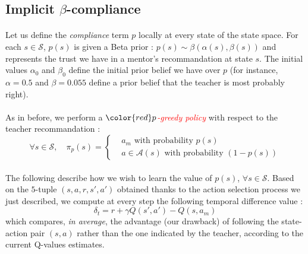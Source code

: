 \documentclass[a4paper]{report}
\begin{document}
{{{		\subsection{Implicit $\beta$-compliance}
		{
			\paragraph{}  Let us define the \emph{compliance} term $p$ locally at every state of the state space. For each $s\in\mathcal{S}$, $p(s)$ is given a Beta prior : $p(s)\sim \beta(\alpha(s),\beta(s))$ and represents the trust we have in a mentor's recommandation at state $s$. The initial values $\alpha_0$ and $\beta_0$ define the initial prior belief we have over $p$ (for instance, $\alpha=0.5$ and $\beta = 0.055$ define a prior belief that the teacher is most probably right). 
			
			\paragraph{} As in before, we perform a $\color{red}p$\textcolor{red}{\emph{-greedy policy}} with respect to the teacher recommandation : 
			\begin{equation}
				\forall s\in\mathcal{S}, \quad \pi_p(s) = 
					\left\{ 
					\begin{aligned}
						&a_m \text{ with probability } p(s) \\
						& a\in\mathcal{A}(s) \text{ with probability } (1-p(s))
					\end{aligned}
					\right. 
			\end{equation}
		
			\paragraph{} The following describe how we wish to learn the value of $p(s)$, $\forall s\in\mathcal{S}$. Based on the $5$-tuple $(s,a,r,s',a')$ obtained thanks to the action selection process we just described, we compute at every step the following temporal difference value : 
			\begin{equation}
				\delta_t = r + \gamma Q(s',a') - Q(s,a_m)
			\end{equation}
			which compares, \emph{in average}, the advantage (our drawback) of following the state-action pair $(s,a)$ rather than the one indicated by the teacher, according to the current Q-values estimates. 
		
}}}}
\end{document}
